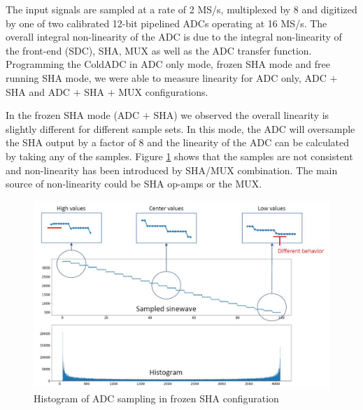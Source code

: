 \label{sec:5.4}


The input signals are sampled at a rate of 2 MS/s, multiplexed by 8 and digitized by one of two calibrated 12-bit pipelined ADCs operating at 16 MS/s. The overall integral non-linearity of the ADC is due to the integral non-linearity of the front-end (SDC), SHA, MUX as well as the ADC transfer function. Programming the ColdADC in ADC only mode, frozen SHA mode and free running SHA mode, we were able to measure linearity for ADC only, ADC $+$ SHA and ADC $+$ SHA $+$ MUX configurations. 

In the frozen SHA mode (ADC $+$ SHA) we observed the overall linearity is slightly different for different sample sets. In this mode, the ADC will oversample the SHA output by a factor of 8 and the linearity of the ADC can be calculated by taking any of the samples. Figure \ref{fig:sha_sample_hist} shows that the samples are not consistent and non-linearity has been introduced by SHA/MUX combination. The main source of non-linearity could be SHA op-amps or the MUX.
\begin{figure}[h!]
\centering
  \includegraphics[width=0.7\linewidth]{figures/prakash_fig/sha_sample_hist.JPG}
  \caption{Histogram of ADC sampling in frozen SHA configuration}
  \label{fig:sha_sample_hist}
\end{figure}


